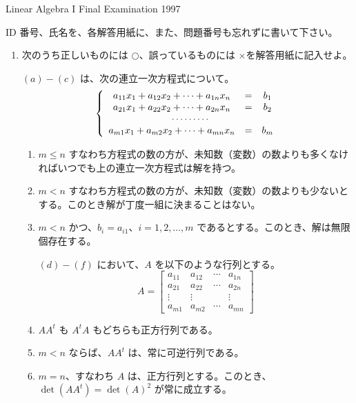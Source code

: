 \documentclass[11pt]{jarticle}
\newcommand{\batsu}{{\large $\times$}}
\newcommand{\maru}{$\bigcirc$}
\begin{document}
\begin{center}
{\gt\Large Linear Algebra I Final Examination 1997}
\end{center}

\noindent
ID 番号、氏名を、各解答用紙に、また、問題番号も忘れずに書いて下さい。

\begin{enumerate}
\item 次のうち正しいものには \maru、誤っているものには \batsu を解答用紙に記入せよ。

     $(a)-(c)$ は、次の連立一次方程式について。
     $$\left\{\begin{array}{ccc}
a_{11}x_1 + a_{12}x_2 + \cdots + a_{1n}x_n & = & b_1\\
a_{21}x_1 + a_{22}x_2 + \cdots + a_{2n}x_n & = & b_2\\
\multicolumn{3}{c}{\cdots\cdots\cdots} \\
a_{m1}x_1 + a_{m2}x_2 + \cdots + a_{mn}x_n & = & b_m
\end{array}\right.$$
     \begin{enumerate}
     \item $m\leq n$ すなわち方程式の数の方が、未知数（変数）の数よりも多くなければいつでも上の連立一次方程式は解を持つ。
     \item $m<n$ すなわち方程式の数の方が、未知数（変数）の数よりも少ないとする。このとき解が丁度一組に決まることはない。
     \item $m<n$ かつ、$b_i = a_{i1}$、$i = 1,2,\ldots, m$ であるとする。このとき、解は無限個存在する。
     
     \medskip\noindent
     $(d)-(f)$ において、$A$ を以下のような行列とする。
     $$A = \left[\begin{array}{cccc}
a_{11} & a_{12} & \cdots & a_{1n}\\
a_{21} & a_{22} & \cdots & a_{2n}\\
\vdots & \vdots &            & \vdots\\
a_{m1} & a_{m2} & \cdots & a_{mn}
\end{array}
\right]$$
     \item $AA^t$ も $A^tA$ もどちらも正方行列である。
     \item $m<n$ ならば、$AA^t$ は、常に可逆行列である。
     \item $m = n$、すなわち $A$ は、正方行列とする。このとき、
     $\det (AA^t) = \det (A)^2$ が常に成立する。
     \end{enumerate}


\end{enumerate}
\end{document}
